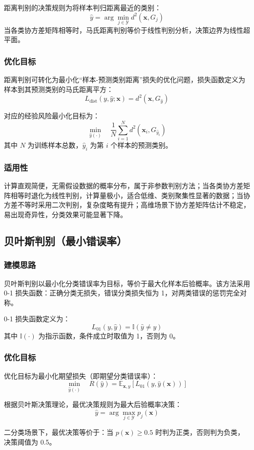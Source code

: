 \documentclass[12pt,a4paper]{article}
\newcommand{\x}{\boldsymbol{x}}
\newcommand{\I}{\mathbb{I}}
\begin{document}
距离判别的决策规则为将样本判归距离最近的类别：
$$
\hat{y} = \arg\min_{j \in \mathcal{Y}} d^2(\x, G_j)
$$
当各类协方差矩阵相等时，马氏距离判别等价于线性判别分析，决策边界为线性超平面。

\subsubsection{优化目标}
距离判别可转化为最小化“样本-预测类别距离”损失的优化问题，损失函数定义为样本到其预测类别的马氏距离平方：
$$
L_{\text{dist}}(y, \hat{y}; \x) = d^2(\x, G_{\hat{y}})
$$

对应的经验风险最小化目标为：
$$
\min_{\hat{y}(\cdot)} \quad \frac{1}{N} \sum_{i=1}^N d^2(\x_i, G_{\hat{y}_i})
$$
其中 $N$ 为训练样本总数，$\hat{y}_i$ 为第 $i$ 个样本的预测类别。

\subsubsection{适用性}
计算直观简便，无需假设数据的概率分布，属于非参数判别方法；当各类协方差矩阵相等时退化为线性判别，计算量极小，适合低维、类别聚集性显著的数据；当协方差不等时采用二次判别，复杂度略有提升；高维场景下协方差矩阵估计不稳定，易出现奇异性，分类效果可能显著下降。

\subsection{贝叶斯判别（最小错误率）}
\subsubsection{建模思路}
贝叶斯判别以最小化分类错误率为目标，等价于最大化样本后验概率。该方法采用 0-1 损失函数：正确分类无损失，错误分类损失恒为 1，对两类错误的惩罚完全对称。

0-1 损失函数定义为：
$$
L_{01}(y, \hat{y}) = \I(\hat{y} \neq y)
$$
其中 $\I(\cdot)$ 为指示函数，条件成立时取值为 1，否则为 0。

\subsubsection{优化目标}
优化目标为最小化期望损失（即期望分类错误率）：
$$
\min_{\hat{y}(\cdot)} \quad R(\hat{y}) = \mathbb{E}_{\x, y} \left[ L_{01}(y, \hat{y}(\x)) \right]
$$

根据贝叶斯决策理论，最优决策规则为最大后验概率决策：
$$
\hat{y} = \arg\max_{j \in \mathcal{Y}} p_j(\x)
$$

二分类场景下，最优决策等价于：当 $p(\x) \geq 0.5$ 时判为正类，否则判为负类，决策阈值为 0.5。
\end{document}
